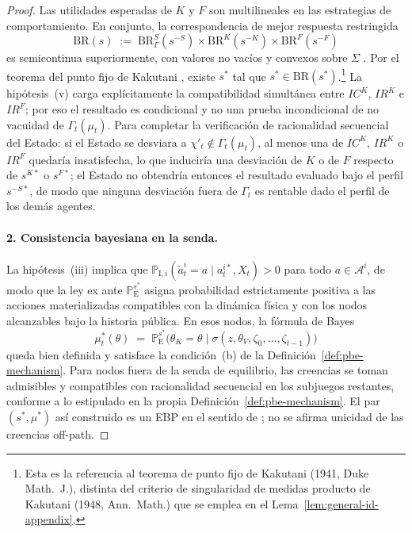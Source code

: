 \documentclass[12pt]{article}
\providecommand{\textcite}{\citet}
\theoremstyle{definition}
\theoremstyle{remark}
\newcommand{\ProbE}{\mathbb{P}_{\mathrm{E}}}
\newcommand{\ProbI}[1]{\mathbb{P}_{\mathrm{I},#1}}
\newcommand{\1}{\mathbf{1}}
\begin{document}
\begin{proof}
Las utilidades esperadas de $K$ y $F$ son multilineales en las estrategias de comportamiento. En conjunto, la correspondencia de mejor respuesta restringida
\[
\mathrm{BR}(s)\;:=\;\mathrm{BR}^S_\Gamma(s^{-S})\times\mathrm{BR}^K(s^{-K})\times\mathrm{BR}^F(s^{-F})
\]
es semicontinua superiormente, con valores no vacíos y convexos sobre $\Sigma$ \textcite{FudenbergTirole1991}. Por el teorema del punto fijo de Kakutani \textcite{Kakutani1941}, existe $s^\ast$ tal que $s^\ast\in\mathrm{BR}(s^\ast)$.\footnote{Esta es la referencia al teorema de punto fijo de Kakutani (1941, Duke Math.\ J.), distinta del criterio de singularidad de medidas producto de Kakutani (1948, Ann.\ Math.) que se emplea en el Lema~\ref{lem:general-id-appendix}.} La hipótesis~(v) carga explícitamente la compatibilidad simultánea entre $IC^K$, $IR^K$ e $IR^F$; por eso el resultado es condicional y no una prueba incondicional de no vacuidad de $\Gamma_t(\mu_t)$. Para completar la verificación de racionalidad secuencial del Estado: si el Estado se desviara a $\chi'_t\notin\Gamma_t(\mu_t)$, al menos una de $IC^K$, $IR^K$ o $IR^F$ quedaría insatisfecha, lo que induciría una desviación de $K$ o de $F$ respecto de $s^{K\ast}$ o $s^{F\ast}$; el Estado no obtendría entonces el resultado evaluado bajo el perfil $s^{-S\ast}$, de modo que ninguna desviación fuera de $\Gamma_t$ es rentable dado el perfil de los demás agentes.

\paragraph{2. Consistencia bayesiana en la senda.}
La hipótesis~(iii) implica que $\ProbI{i}(\tilde{a}_t^i=a\mid a_t^{i\ast},X_t)>0$ para todo $a\in\mathcal{A}^i$, de modo que la ley ex ante $\ProbE^{s^\ast}$ asigna probabilidad estrictamente positiva a las acciones materializadas compatibles con la dinámica física y con los nodos alcanzables bajo la historia pública. En esos nodos, la fórmula de Bayes
\[
\mu_t^\ast(\theta)\;=\;\ProbE^{s^\ast}\!\bigl(\theta_K=\theta\mid\sigma(z,\theta_V,\zeta_0,\ldots,\zeta_{t-1})\bigr)
\]
queda bien definida y satisface la condición~(b) de la Definición~\ref{def:pbe-mechanism}. Para nodos fuera de la senda de equilibrio, las creencias se toman admisibles y compatibles con racionalidad secuencial en los subjuegos restantes, conforme a lo estipulado en la propia Definición~\ref{def:pbe-mechanism}. El par $(s^\ast,\mu^\ast)$ así construido es un EBP en el sentido de \textcite{FudenbergTirole1991,KrepsWilson1982}; no se afirma unicidad de las creencias off-path.


\end{proof}
\end{document}
